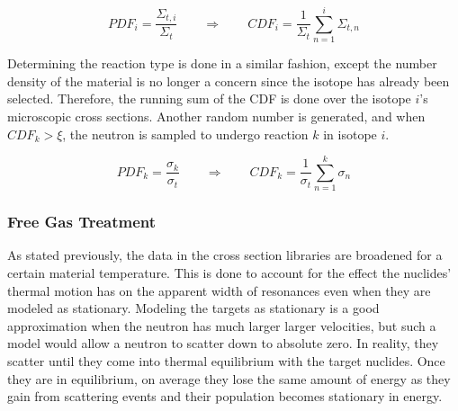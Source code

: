 \begin{equation}
\label{isotope_selection}
PDF_i = \frac{\Sigma_{t,i}}{\Sigma_t} \qquad \Rightarrow \qquad CDF_i = \frac{1}{\Sigma_t } \sum_{n=1}^i \Sigma_{t,n}
\end{equation}

Determining the reaction type is done in a similar fashion, except the number density of the material is no longer a concern since the isotope has already been selected.  Therefore, the running sum of the CDF is done over the isotope $i$'s microscopic cross sections.  Another random number is generated, and when $CDF_k > \xi$, the neutron is sampled to undergo reaction $k$ in isotope $i$.

\begin{equation}
\label{reaction_selection}
PDF_k = \frac{\sigma_k}{\sigma_t} \qquad \Rightarrow \qquad CDF_k = \frac{1}{\sigma_{t} } \sum_{n=1}^k \sigma_{n}
\end{equation}

\subsubsection{Free Gas Treatment}

As stated previously, the data in the cross section libraries are broadened for a certain material temperature.  This is done to account for the effect the nuclides' thermal motion has on the apparent width of resonances even when they are modeled as stationary.  Modeling the targets as stationary is a good approximation when the neutron has much larger larger velocities, but such a model would allow a neutron to scatter down to absolute zero.  In reality, they scatter until they come into thermal equilibrium with the target nuclides.  Once they are in equilibrium, on average they lose the same amount of energy as they gain from scattering events and their population becomes stationary in energy.  

